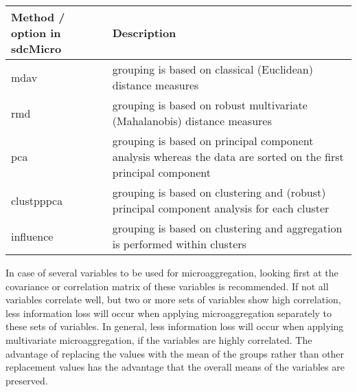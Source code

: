 \documentclass[letterpaper,10pt,english]{sphinxmanual}
\begin{document}
\begin{savenotes}\sphinxattablestart
\centering
{}
\label{\detokenize{anon_methods:tab513}}\label{\detokenize{anon_methods:id42}}
\sphinxaftercaption
\begin{tabulary}{\linewidth}[t]{|T|T|}
\hline
\sphinxstyletheadfamily 
Method / option in sdcMicro
&\sphinxstyletheadfamily 
Description
\\
\hline
mdav
&
grouping is based on classical (Euclidean) distance measures
\\
\hline
rmd
&
grouping is based on robust multivariate (Mahalanobis) distance measures
\\
\hline
pca
&
grouping is based on principal component analysis whereas the data are sorted on the first principal component
\\
\hline
clustpppca
&
grouping is based on clustering and (robust) principal component analysis for each cluster
\\
\hline
influence
&
grouping is based on clustering and aggregation is performed within clusters
\\
\hline
\end{tabulary}
\par
\sphinxattableend\end{savenotes}

In case of several variables to be used for microaggregation, looking
first at the covariance or correlation matrix of these variables is
recommended. If not all variables correlate well, but two or more sets
of variables show high correlation, less information loss will occur
when applying microaggregation separately to these sets of variables. In
general, less information loss will occur when applying multivariate
microaggregation, if the variables are highly correlated. The advantage
of replacing the values with the mean of the groups rather than other
replacement values has the advantage that the overall means of the
variables are preserved.
\end{document}
